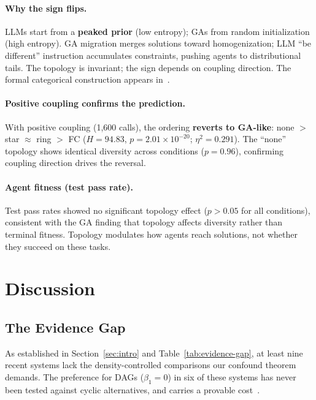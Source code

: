 \documentclass[runningheads]{llncs}
\begin{document}
\paragraph{Why the sign flips.}
LLMs start from a \textbf{peaked prior} (low entropy); GAs from
random initialization (high entropy). GA migration merges solutions
toward homogenization; LLM ``be different'' instruction accumulates
constraints, pushing agents to distributional tails. The topology is
invariant; the sign depends on coupling direction. The formal
categorical construction appears in~\cite{langer2026games}.

\paragraph{Positive coupling confirms the prediction.}
With positive coupling (1,600 calls), the ordering \textbf{reverts to
GA-like}: none $>$ star $\approx$ ring $>$ FC ($H = 94.83$,
$p = 2.01 \times 10^{-20}$; $\eta^2 = 0.291$). The ``none''
topology shows identical diversity across conditions ($p = 0.96$),
confirming coupling direction drives the reversal.

\paragraph{Agent fitness (test pass rate).}
Test pass rates showed no significant topology effect ($p > 0.05$ for
all conditions), consistent with the GA finding that topology affects
diversity rather than terminal fitness. Topology modulates how agents
reach solutions, not whether they succeed on these tasks.

\section{Discussion}
\label{sec:discussion}

\subsection{The Evidence Gap}

As established in Section~\ref{sec:intro} and Table~\ref{tab:evidence-gap}, at least nine recent systems lack the density-controlled comparisons our confound theorem demands. The preference for DAGs ($\beta_1 = 0$) in six of these systems has never been tested against cyclic alternatives, and carries a provable cost~\cite{ao2026reliability}.
\end{document}
